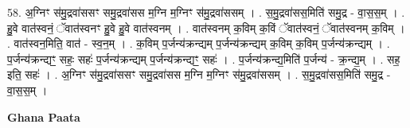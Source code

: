 \documentclass[17pt]{extarticle}
\begin{document}
58. अ॒ग्निꣳ स॑मु॒द्रवा॑ससꣳ समु॒द्रवा॑सस म॒ग्नि म॒ग्निꣳ स॑मु॒द्रवा॑ससम् । . स॒मु॒द्रवा॑सस॒मिति॑ समु॒द्र - वा॒स॒स॒म् । . हु॒वे वात॑स्वनं॒ ॅवात॑स्वनꣳ हु॒वे हु॒वे वात॑स्वनम् । . वात॑स्वनम् क॒विम् क॒विं ॅवात॑स्वनं॒ ॅवात॑स्वनम् क॒विम् । . वात॑स्वन॒मिति॒ वात॑ - स्व॒न॒म् । . क॒विम् प॒र्जन्य॑क्रन्द्यम् प॒र्जन्य॑क्रन्द्यम् क॒विम् क॒विम् प॒र्जन्य॑क्रन्द्यम् । . प॒र्जन्य॑क्रन्द्यꣳ॒॒ सहः॒ सहः॑ प॒र्जन्य॑क्रन्द्यम् प॒र्जन्य॑क्रन्द्यꣳ॒॒ सहः॑ । . प॒र्जन्य॑क्रन्द्य॒मिति॑ प॒र्जन्य॑ - क्र॒न्द्य॒म् । . सह॒ इति॒ सहः॑ । . अ॒ग्निꣳ स॑मु॒द्रवा॑ससꣳ समु॒द्रवा॑सस म॒ग्नि म॒ग्निꣳ स॑मु॒द्रवा॑ससम् । . स॒मु॒द्रवा॑सस॒मिति॑ समु॒द्र - वा॒स॒स॒म् । \newline

\textbf{Ghana Paata } \newline
\end{document}
